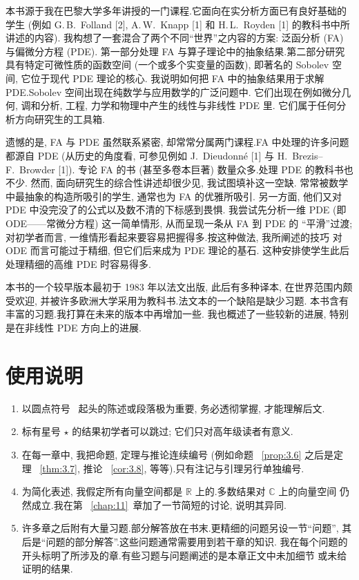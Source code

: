 本书源于我在巴黎大学多年讲授的一门课程.它面向在实分析方面已有良好基础的学生
(例如 G.\,B.~Folland [2], A.\,W.~Knapp [1] 和 H.\,L.~Royden [1] 的教科书中所讲述的内容).
我构想了一套混合了两个不同``世界''之内容的方案: 泛函分析 (FA) 与偏微分方程 (PDE).
第一部分处理 FA 与算子理论中的抽象结果.第二部分研究具有特定可微性质的函数空间
(一个或多个实变量的函数), 即著名的 Sobolev 空间, 它位于现代 PDE 理论的核心.
我说明如何把 FA 中的抽象结果用于求解 PDE.Sobolev 空间出现在纯数学与应用数学的广泛问题中.
它们出现在例如微分几何, 调和分析, 工程, 力学和物理中产生的线性与非线性 PDE 里.
它们属于任何分析方向研究生的工具箱.

遗憾的是, FA 与 PDE 虽然联系紧密, 却常常分属两门课程.FA 中处理的许多问题都源自 PDE
(从历史的角度看, 可参见例如 J.~Dieudonné [1] 与 H.~Brezis--F.~Browder [1]).
专论 FA 的书 (甚至多卷本巨著) 数量众多.处理 PDE 的教科书也不少.
然而, 面向研究生的综合性讲述却很少见, 我试图填补这一空缺.
常常被数学中最抽象的构造所吸引的学生, 通常也为 FA 的优雅所吸引.
另一方面, 他们又对 PDE 中没完没了的公式以及数不清的下标感到畏惧.
我尝试先分析一维 PDE (即 ODE——常微分方程) 这一简单情形, 从而呈现一条从 FA 到 PDE 的
``平滑''过渡; 对初学者而言, 一维情形看起来要容易把握得多.按这种做法, 我所阐述的技巧
对 ODE 而言可能过于精细, 但它们后来成为 PDE 理论的基石.
这种安排使学生此后处理精细的高维 PDE 时容易得多.

本书的一个较早版本最初于 1983 年以法文出版, 此后有多种译本, 在世界范围内颇受欢迎,
并被许多欧洲大学采用为教科书.法文本的一个缺陷是缺少习题.
本书含有丰富的习题.我打算在未来的版本中再增加一些.
我也概述了一些较新的进展, 特别是在非线性 PDE 方向上的进展.

\section*{使用说明}

\begin{enumerate}[label=\arabic*., leftmargin=2.2em, itemsep=0.35em]
	\item 以圆点符号 \textbullet\ 起头的陈述或段落极为重要, 务必透彻掌握, 才能理解后文.
	\item 标有星号 $\star$ 的结果初学者可以跳过; 它们只对高年级读者有意义.
	\item 在每一章中, 我把命题, 定理与推论连续编号 (例如命题~
\ref{prop:3.6} 之后是定理~
\ref{thm:3.7}, 推论~
\ref{cor:3.8},
	      等等).只有注记与引理另行单独编号.
	\item 为简化表述, 我假定所有向量空间都是 $\mathbb{R}$ 上的.多数结果对 $\mathbb{C}$ 上的向量空间
	      仍然成立.我在第~
\ref{chap:11}~章加了一节简短的讨论, 说明其异同.
	\item 许多章之后附有大量习题.部分解答放在书末.更精细的问题另设一节``问题'',
	      其后是``问题的部分解答''.这些问题通常需要用到若干章的知识.
	      我在每个问题的开头标明了所涉及的章.有些习题与问题阐述的是本章正文中未加细节
	      或未给证明的结果.
\end{enumerate}

